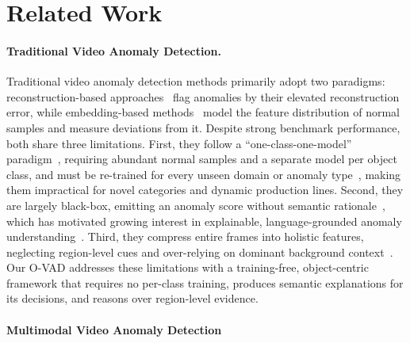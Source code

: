 \documentclass[runningheads]{llncs}
\begin{document}
\section{Related Work}
\label{sec:related}

\paragraph{\textbf{Traditional Video Anomaly Detection.}}
Traditional video anomaly detection methods primarily adopt two paradigms: reconstruction-based approaches~\cite{he2024mambaad, fan2024revitalizing, zavrtanik2021draem, zhang2024realnet, zhangdiffusionad, fang2023fastrecon} flag anomalies by their elevated reconstruction error, while embedding-based methods~\cite{jiang2022softpatch, hyun2024reconpatch, roth2022towards, defard2021padim, guo2025dinomaly} model the feature distribution of normal samples and measure deviations from it. Despite strong benchmark performance, both share three limitations. First, they follow a ``one-class-one-model'' paradigm~\cite{gu2024anomalygpt}, requiring abundant normal samples and a separate model per object class, and must be re-trained for every unseen domain or anomaly type~\cite{li2026vadtree}, making them impractical for novel categories and dynamic production lines. Second, they are largely black-box, emitting an anomaly score without semantic rationale~\cite{wu2024weakly}, which has motivated growing interest in explainable, language-grounded anomaly understanding~\cite{li2026vadtree, zheng2026iad}. Third, they compress entire frames into holistic features, neglecting region-level cues and over-relying on dominant background context~\cite{li2025video}. Our O-VAD addresses these limitations with a training-free, object-centric framework that requires no per-class training, produces semantic explanations for its decisions, and reasons over region-level evidence.



\paragraph{\textbf{Multimodal Video Anomaly Detection}}
\end{document}
